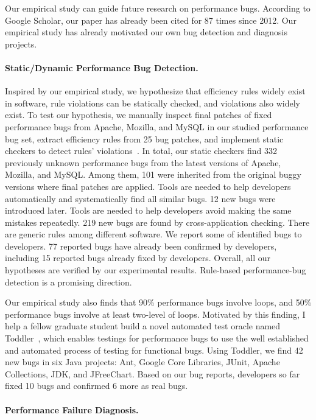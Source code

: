 \documentclass[10pt]{article}
\begin{document}
Our empirical study can guide future research on performance bugs. According to Google Scholar, our paper has already been cited for 87 times since 2012. 
Our empirical study has already motivated our own bug detection and diagnosis projects.


\paragraph{Static/Dynamic Performance Bug Detection.}

Inspired by our empirical study, we hypothesize that 
efficiency rules widely exist in software, 
rule violations can be statically checked, 
and violations also widely exist. 
To test our hypothesis, we manually inspect final patches of fixed performance bugs from Apache, Mozilla, and MySQL in our studied performance bug set, 
extract efficiency rules from 25 bug patches, 
and implement static checkers to detect rules' violations~\cite{jin12perfbug}. 
In total, our static checkers find 332 previously unknown performance bugs from the latest versions of Apache, Mozilla, and MySQL. 
Among them, 101 were inherited from the original buggy versions where final patches are applied. 
Tools are needed to help developers automatically and systematically find all similar bugs. 
12 new bugs were introduced later. 
Tools are needed to help developers avoid making the same mistakes repeatedly. 
219 new bugs are found by cross-application checking. There are generic rules among different software. 
We report some of identified bugs to developers. 
77 reported bugs have already been confirmed by developers, including 15 reported bugs already fixed by developers. 
Overall, all our hypotheses are verified by our experimental results. Rule-based performance-bug detection is a promising direction.

Our empirical study also finds that 90\% performance bugs involve loops, 
and 50\% performance bugs involve at least two-level of loops. 
Motivated by this finding, I help a fellow graduate student build a novel automated test oracle named Toddler~\cite{Nistor13ICSE}, 
which enables testings for performance bugs to use the well established and automated process of testing for functional bugs. 
Using Toddler, we find 42 new bugs in six Java projects: 
Ant, Google Core Libraries, JUnit, Apache Collections, JDK, and JFreeChart. 
Based on our bug reports, developers so far fixed 10 bugs and confirmed 6 more as real bugs.

\paragraph{Performance Failure Diagnosis.}
\end{document}
